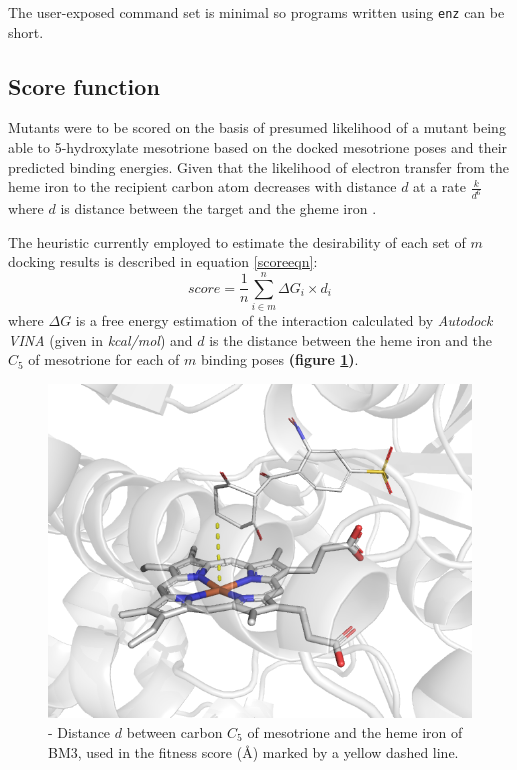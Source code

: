 \documentclass[16pt]{article}
\begin{document}
The user-exposed command set is minimal so programs written using \texttt{enz} can be short.

\subsection{Score function \label{scorefn}}
Mutants were to be scored on the basis of presumed likelihood of a mutant being able to 5-hydroxylate mesotrione based on the docked mesotrione poses and their predicted binding energies.
Given that the likelihood of electron transfer from the heme iron to the recipient carbon atom decreases with distance $d$ at a rate $\frac{k}{d^6}$ where $d$ is distance between the target and the gheme iron \cite{moser2008distance}.

The heuristic currently employed to estimate the desirability of each set of $m$ docking results is described in equation \ref{scoreeqn}: %
\begin{equation}\label{scoreeqn}
	score = \frac{1}{n}\sum^{n}_{i\in m} \Delta G_{i} \times d_{i}
\end{equation}
where $\Delta G$ is a free energy estimation of the interaction calculated by \textit{Autodock VINA} (given in \textit{kcal/mol}) and $d$ is the distance between the heme iron and the $C_{5}$ of mesotrione for each of $m$ binding poses \textbf{(figure \ref{score})}. 

\begin{figure}
	\includegraphics[width=\textwidth]{img/score.png}
	\caption{\label{score} - Distance $d$  between carbon $C_5$ of mesotrione and the heme iron of BM3, used in the fitness score (\AA) marked by a yellow dashed line.}
\end{figure}
\end{document}
